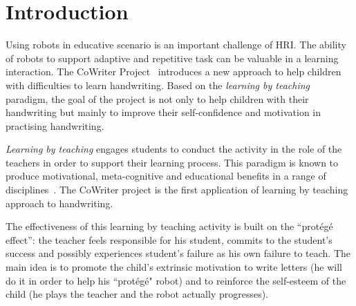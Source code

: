 \documentclass[conference]{IEEEtran}
\begin{document}
\section{Introduction}
%
%
%
%
%
%
%
%


Using robots in educative scenario is an important challenge of HRI.
The ability of robots to support adaptive and repetitive task can be valuable in a learning interaction.
The CoWriter Project~\cite{Hood,jacq2016building} introduces a new approach to help children with difficulties to learn handwriting. 
Based on the \emph{learning by teaching} paradigm, the goal of the project is not only to help children with their handwriting but mainly to improve their self-confidence and motivation in practising handwriting.

\emph{Learning by teaching} engages students to conduct the activity in the role of the teachers in order to support their learning process. 
This  paradigm is known to produce motivational, meta-cognitive and educational benefits in a range of disciplines~\cite{Rohrbeck2003}. 
The CoWriter project is the first application of learning by teaching approach to handwriting.

The effectiveness of this learning by teaching activity is built on the ``prot\'eg\'e effect'': the teacher feels responsible for his student, commits
to the student's success and possibly experiences student's failure as his own
failure to teach. 
The main idea is to promote the child's extrinsic motivation to write letters (he will do it in order to help his ``prot\'eg\'e" robot) and to reinforce the self-esteem of the child (he plays the teacher and the robot actually progresses).
\end{document}
